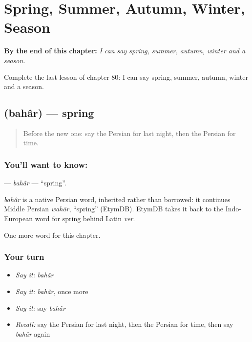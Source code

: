 
\chapter{Spring, Summer, Autumn, Winter, Season}
\label{ch:fa-spring-summer-autumn-winter-season}

\begin{chapteropening}
\textbf{By the end of this chapter:} \emph{I can say spring, summer, autumn, winter and a season.}

Complete the last lesson of chapter 80: I can say spring, summer, autumn, winter and a season.
\end{chapteropening}

\section[\texorpdfstring{\fa{بهار} (bahâr)}{بهار (bahâr)}]{ (bahâr) — spring}

\label{lesson:FA-C80-bahar}



\begin{quote}
Before the new one: say the Persian for last night, then the Persian for time.
\end{quote}

\subsection*{You'll want to know: }
\textbf{} — \emph{bahâr} — \textquotedblleft{}spring\textquotedblright{}.

\begin{cousinweb}
\emph{bahâr} is a native Persian word, inherited rather than borrowed: it continues Middle Persian \emph{wahār}, \textquotedblleft{}spring\textquotedblright{} (EtymDB). EtymDB takes it back to the Indo-European word for spring behind Latin \emph{ver}.
\end{cousinweb}

\begin{grammarlens}[title={What you've built}]
One more word for this chapter.
\end{grammarlens}

\subsection*{Your turn}
\begin{itemize}
\raggedright
  \item \emph{Say it:} \emph{bahâr}
  \item \emph{Say it:} \emph{bahâr}, once more
  \item \emph{Say it:} say \emph{bahâr}
  \item \emph{Recall:} say the Persian for last night, then the Persian for time, then say \emph{bahâr} again
\end{itemize}


